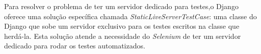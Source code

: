 Para resolver o problema de ter um servidor dedicado para testes,o Django oferece uma solução específica chamada \textit{StaticLiveServerTestCase}\cite{staticfiles2018}: uma classe do Django que sobe um servidor exclusivo para os testes escritos na classe que herdá-la. Esta solução atende a necessidade do \textit{Selenium} de ter um servidor dedicado para rodar os testes automatizados.




